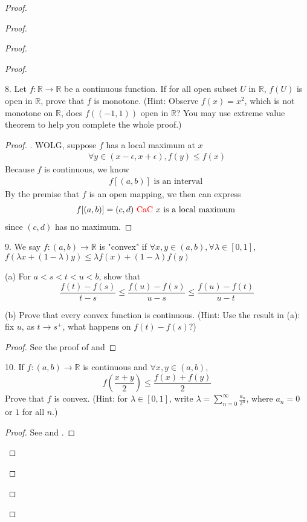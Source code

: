 \documentclass{report}
\begin{document}
\begin{proof}
\begin{proof}
\begin{proof}
\begin{proof}
\begin{question}{}{}
8. Let \( f : \mathbb{R} \to \mathbb{R} \) be a continuous function. If for all open subset \( U \) in \( \mathbb{R} \), \( f(U) \) is open in \( \mathbb{R} \), prove that \( f \) is monotone.
(Hint: Observe \( f(x) = x^2 \), which is not monotone on \( \mathbb{R} \), does \( f((-1, 1)) \) open in \( \mathbb{R} \)? You may use extreme value theorem to help you complete the whole proof.)
\end{question}
\begin{proof}
. WOLG, suppose $f$ has a local maximum at $x$
\begin{align*}
\forall y\in (x-\epsilon ,x+\epsilon ),f(y)\leq f(x)
\end{align*}
Because $f$ is continuous, we know 
 \begin{align*}
f[(a,b)]\text{ is an interval }
\end{align*}
By the premise that $f$ is an open mapping, we then can express 
 \begin{align*}
f[(a,b)]=(c,d)\text{ \textcolor{red}{CaC} } x \text{ is a local maximum }
\end{align*}
since $(c,d)$ has no maximum.
\end{proof}
\begin{question}{}{}
9. We say \( f : (a, b) \to \mathbb{R} \) is "convex" if \( \forall x, y \in (a, b), \forall \lambda \in [0, 1] \),
\( f(\lambda x + (1 - \lambda)y) \leq \lambda f(x) + (1 - \lambda)f(y) \)

(a) For \( a < s < t < u < b \), show that
\[
\frac{f(t) - f(s)}{t - s} \leq \frac{f(u) - f(s)}{u - s} \leq \frac{f(u) - f(t)}{u - t}
\]

(b) Prove that every convex function is continuous.
(Hint: Use the result in (a): fix \( u \), as \( t \to s^+ \), what happens on \( f(t) - f(s) \)?)
\end{question}
\begin{proof}
See the proof of  and 
\end{proof}
\begin{question}{}{}

10. If \( f : (a, b) \to \mathbb{R} \) is continuous and \( \forall x, y \in (a, b) \),
\[
f \left( \frac{x + y}{2} \right) \leq \frac{f(x) + f(y)}{2}
\]
Prove that \( f \) is convex.
(Hint: for \( \lambda \in [0, 1] \), write \( \lambda = \sum_{n=0}^{\infty} \frac{a_n}{2^n} \), where \( a_n = 0 \) or \( 1 \) for all \( n \).)
\end{question}
\begin{proof}
See  and . 
\end{proof}

\end{proof}
\end{proof}
\end{proof}
\end{proof}
\end{document}
